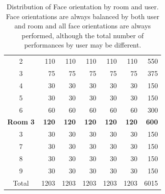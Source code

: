 \begin{table}[tbp]
\begin{tabular}{@{}crrrrrr@{}}
		2          & 110          & 110          & 110          & 110          & 110          & 550           \\
		3          & 75           & 75           & 75           & 75           & 75           & 375           \\
		4          & 30           & 30           & 30           & 30           & 30           & 150           \\
		5          & 30           & 30           & 30           & 30           & 30           & 150           \\
		6          & 60           & 60           & 60           & 60           & 60           & 300           \\ \midrule
		\textbf{Room 3} & \textbf{120} & \textbf{120} & \textbf{120} & \textbf{120} & \textbf{120} & \textbf{600}  \\ \midrule
		3          & 30           & 30           & 30           & 30           & 30           & 150           \\
		7          & 30           & 30           & 30           & 30           & 30           & 150           \\
		8          & 30           & 30           & 30           & 30           & 30           & 150           \\
		9          & 30           & 30           & 30           & 30           & 30           & 150           \\ \midrule
		Total      & 1203         & 1203         & 1203         & 1203         & 1203         & 6015          \\ \bottomrule
	\end{tabular}
	\caption{Distribution of Face orientation by room and user. Face orientations are always balanced by both user and room and all face orientations are always performed, although the total number of performances by user may be different.}
\end{table}

